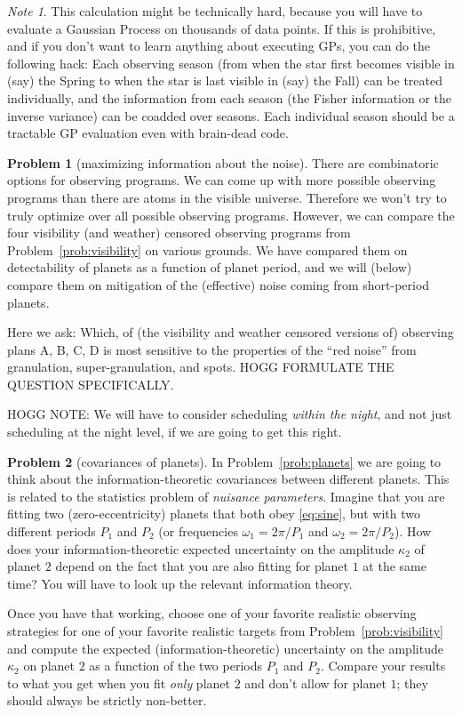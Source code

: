 \documentclass{article}
\theoremstyle{definition}
\newcommand{\problemname}{Problem}
\newtheorem{problem}{\problemname}
\newcommand{\probref}[1]{\problemname~\ref{#1}}
\theoremstyle{remark}
\newcommand{\notename}{Note}
\newtheorem{note}{\notename}[problem]
\begin{document}
\begin{note}
This calculation might be technically hard, because you will have to evaluate a Gaussian Process on thousands of data points.
If this is prohibitive, and if you don't want to learn anything about executing GPs, you can do the following hack:
Each observing season (from when the star first becomes visible in (say) the Spring to when the star is last visible in (say) the Fall) can be treated individually, and the information from each season (the Fisher information or the inverse variance) can be coadded over seasons.
Each individual season should be a tractable GP evaluation even with brain-dead code.
\end{note}

\begin{problem}[maximizing information about the noise]\label{prob:noise}
There are combinatoric options for observing programs.
We can come up with more possible observing programs than there are atoms in the visible universe.
Therefore we won't try to truly optimize over all possible observing programs.
However, we can compare the four visibility (and weather) censored observing programs from \probref{prob:visibility} on various grounds.
We have compared them on detectability of planets as a function of planet period, and we will (below) compare them on mitigation of the (effective) noise coming from short-period planets.

Here we ask: Which, of (the visibility and weather censored versions of) observing plans A, B, C, D is most sensitive to the properties of the ``red noise'' from granulation, super-granulation, and spots.
HOGG FORMULATE THE QUESTION SPECIFICALLY.

HOGG NOTE: We will have to consider scheduling \emph{within the night}, and not just scheduling at the night level, if we are going to get this right.
\end{problem}

\begin{problem}[covariances of planets]\label{prob:nuisances}
In \probref{prob:planets} we are going to think about the information-theoretic covariances between different planets.
This is related to the statistics problem of \emph{nuisance parameters}.
Imagine that you are fitting two (zero-eccentricity) planets that both obey \eqref{eq:sine}, but with two different periods $P_1$ and $P_2$ (or frequencies $\omega_1=2\pi/P_1$ and $\omega_2=2\pi/P_2$).
How does your information-theoretic expected uncertainty on the amplitude $\kappa_2$ of planet $2$ depend on the fact that you are also fitting for planet $1$ at the same time?
You will have to look up the relevant information theory.

Once you have that working, choose one of your favorite realistic observing strategies for one of your favorite realistic targets from \probref{prob:visibility} and compute the expected (information-theoretic) uncertainty on the amplitude $\kappa_2$ on planet $2$ as a function of the two periods $P_1$ and $P_2$.
Compare your results to what you get when you fit \emph{only} planet $2$ and don't allow for planet $1$; they should always be strictly non-better.
\end{problem}
\end{document}
